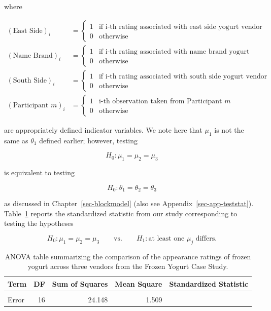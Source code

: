 \documentclass[
  letterpaper,
  DIV=11,
  numbers=noendperiod]{scrreprt}
\theoremstyle{plain}
\theoremstyle{definition}
\theoremstyle{definition}
\theoremstyle{remark}
\begin{document}
where

\[
\begin{aligned}
  (\text{East Side})_i &= \begin{cases}
    1 & \text{if i-th rating associated with east side yogurt vendor} \\
    0 & \text{otherwise}
    \end{cases} \\
  (\text{Name Brand})_i &= \begin{cases}
    1 & \text{if i-th rating associated with name brand yogurt vendor} \\
    0 & \text{otherwise}
    \end{cases} \\
  (\text{South Side})_i &= \begin{cases}
    1 & \text{if i-th rating associated with south side yogurt vendor} \\
    0 & \text{otherwise}
    \end{cases} \\
  (\text{Participant } m)_i &= \begin{cases}
    1 & \text{i-th observation taken from Participant } m \\
    0 & \text{otherwise}
    \end{cases}
\end{aligned}
\]

are appropriately defined indicator variables. We note here that
\(\mu_1\) is not the same as \(\theta_1\) defined earlier; however,
testing

\[H_0: \mu_1 = \mu_2 = \mu_3\]

is equivalent to testing

\[H_0: \theta_1 = \theta_2 = \theta_3\]

as discussed in Chapter~\ref{sec-blockmodel} (also see
Appendix~\ref{sec-app-teststat}). Table~\ref{tbl-blockrecap-anova-table}
reports the standardized statistic from our study corresponding to
testing the hypotheses

\[H_0: \mu_1 = \mu_2 = \mu_3 \qquad \text{vs.} \qquad H_1: \text{at least one } \mu_j \text{ differs.}\]

\hypertarget{tbl-blockrecap-anova-table}{}
\begin{table}
\caption{\label{tbl-blockrecap-anova-table}ANOVA table summarizing the comparison of the appearance ratings of
frozen yogurt across three vendors from the Frozen Yogurt Case Study. }\tabularnewline

\centering
\begin{tabular}[t]{lrrrr}
\toprule
Term & DF & Sum of Squares & Mean Square & Standardized Statistic\\
\midrule
\cellcolor{gray!6}{Vendor} & \cellcolor{gray!6}{2} & \cellcolor{gray!6}{3.185} & \cellcolor{gray!6}{1.593} & \cellcolor{gray!6}{1.055}\\
Error & 16 & 24.148 & 1.509 & \\
\bottomrule
\end{tabular}
\end{table}
\end{document}
